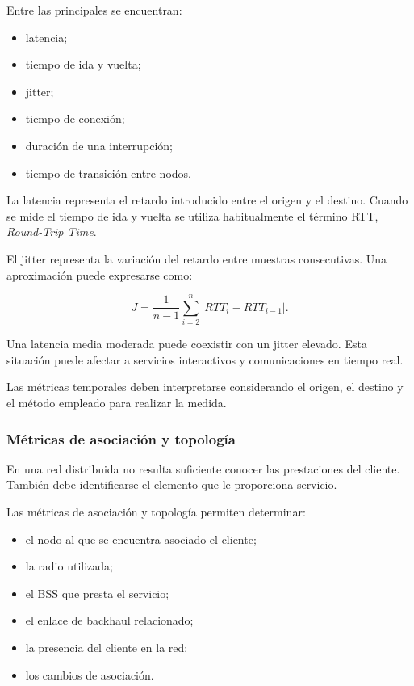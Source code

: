 Entre las principales se encuentran:

\begin{itemize}
    \item latencia;

    \item tiempo de ida y vuelta;

    \item jitter;

    \item tiempo de conexión;

    \item duración de una interrupción;

    \item tiempo de transición entre nodos.
\end{itemize}

La latencia representa el retardo introducido entre el origen y el
destino. Cuando se mide el tiempo de ida y vuelta se utiliza habitualmente
el término RTT, \textit{Round-Trip Time}.

El jitter representa la variación del retardo entre muestras
consecutivas. Una aproximación puede expresarse como:

\[
    J =
    \frac{
        1
    }{
        n-1
    }
    \sum_{i=2}^{n}
    \left|
        RTT_i
        -
        RTT_{i-1}
    \right|.
\]

Una latencia media moderada puede coexistir con un jitter elevado. Esta
situación puede afectar a servicios interactivos y comunicaciones en
tiempo real.

Las métricas temporales deben interpretarse considerando el origen, el
destino y el método empleado para realizar la medida.


\subsubsection*{Métricas de asociación y topología}

En una red distribuida no resulta suficiente conocer las prestaciones del
cliente. También debe identificarse el elemento que le proporciona
servicio.

Las métricas de asociación y topología permiten determinar:

\begin{itemize}
    \item el nodo al que se encuentra asociado el cliente;

    \item la radio utilizada;

    \item el BSS que presta el servicio;

    \item el enlace de backhaul relacionado;

    \item la presencia del cliente en la red;

    \item los cambios de asociación.
\end{itemize}

